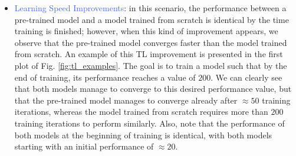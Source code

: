 \begin{itemize}
	\item \textcolor{RoyalBlue}{Learning Speed Improvements}: in this scenario, the performance between a pre-trained model and a model trained from scratch is identical by the time training is finished; however, when this kind of improvement appears, we observe that the pre-trained model converges faster than the model trained from scratch. An example of this TL improvement is presented in the first plot of Fig. \ref{fig:tl_examples}. The goal is to train a model such that by the end of training, its performance reaches a value of $200$. We can clearly see that both models manage to converge to this desired performance value, but that the pre-trained model manages to converge already after $\approx 50$ training iterations, whereas the model trained from scratch requires more than $200$ training iterations to perform similarly. Also, note that the performance of both models at the beginning of training is identical, with both models starting with an initial performance of $\approx20$.


\end{itemize}
